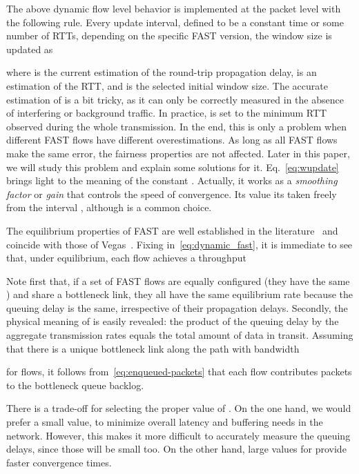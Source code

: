 \documentclass[english,times]{ettauth}
\begin{document}
The above dynamic flow level behavior is implemented at the packet level with
the following rule. Every update interval, defined to be a constant time or
some number of RTTs, depending on the specific FAST version, the window size
is updated as

where  is the current estimation of the round-trip propagation delay,
 is an estimation of the RTT, and  is the
selected initial window size. The accurate estimation of  is a bit tricky,
as it can only be correctly measured in the absence of interfering or
background traffic. In practice,  is set to the minimum RTT observed
during the whole transmission. In the end, this is only a problem when
different FAST flows have different overestimations. As long as all FAST flows
make the same error, the fairness properties are not affected. Later in this
paper, we will study this problem and explain some solutions for it.
Eq.~\eqref{eq:wupdate} brings light to the meaning of the constant .
Actually, it works as a \emph{smoothing factor} or \emph{gain} that controls
the speed of convergence. Its value its taken freely from the interval
, although  is a common choice.

The equilibrium properties of FAST are well established in the
literature~\cite{Wei06,Jin03} and coincide with those of
Vegas~\cite{Low02,Samios03}. Fixing 
in~\eqref{eq:dynamic_fast}, it is immediate to see that, under equilibrium,
each flow achieves a throughput

Note first that, if a set of FAST flows are equally configured (they have the
same ) and share a bottleneck link, they all have the same
equilibrium rate  because the queuing delay  is the same, irrespective of their propagation delays. Secondly, the
physical meaning of  is easily revealed: the product of the queuing
delay by the aggregate transmission rates equals the total amount of data in
transit. Assuming that there is a unique bottleneck link along the path with
bandwidth 

for  flows, it follows from~\eqref{eq:enqueued-packets} that each flow
contributes  packets to the bottleneck queue backlog.

There is a trade-off for selecting the proper value of . On the one
hand, we would prefer a small value, to minimize overall latency and buffering
needs in the network. However, this makes it more difficult to accurately
measure the queuing delays, since those will be small too. On the other hand,
large values for  provide faster convergence times.
\end{document}
